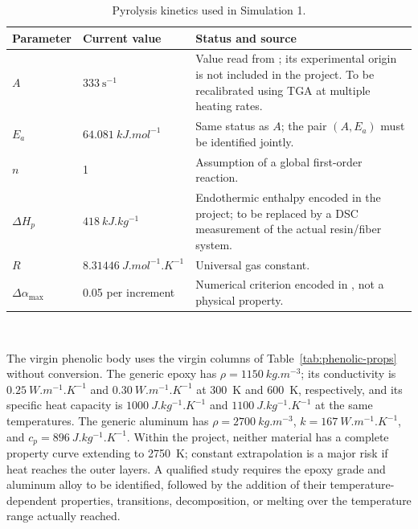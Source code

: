 \documentclass[oneside,openany]{amsdtx}
\begin{document}
\begin{table}[H]
\centering
\small
\renewcommand{\arraystretch}{1.15}
\begin{tabular}{L{0.22\textwidth}M{0.20\textwidth}L{0.47\textwidth}}
\toprule
\textbf{Parameter} & \textbf{Current value} & \textbf{Status and source} \\
\midrule
\(A\) & \(333\ \mathrm{s^{-1}}\) & Value read from
; its experimental origin is not included
in the project. To be recalibrated using TGA at multiple heating rates. \\
\(E_a\) & \(\SI{64.081}{kJ.mol^{-1}}\) & Same status as \(A\); the pair
\((A,E_a)\) must be identified jointly. \\
\(n\) & 1 & Assumption of a global first-order reaction. \\
\(\Delta H_p\) & \(\SI{418}{kJ.kg^{-1}}\) & Endothermic enthalpy encoded in
the project; to be replaced by a DSC measurement of the actual resin/fiber
system. \\
\(R\) & \(\SI{8.31446}{J.mol^{-1}.K^{-1}}\) & Universal gas constant. \\
\(\Delta\alpha_\mathrm{max}\) & 0.05 per increment & Numerical criterion
encoded in , not a physical property. \\
\bottomrule
\end{tabular}~\\[1em]
\caption{Pyrolysis kinetics used in Simulation 1.}
\label{tab:kinetics}
\end{table}

The virgin phenolic body  uses the virgin columns of
Table~\ref{tab:phenolic-props} without conversion. The generic epoxy has
\(\rho=\SI{1150}{kg.m^{-3}}\); its conductivity is
\(\SI{0.25}{W.m^{-1}.K^{-1}}\) and \(\SI{0.30}{W.m^{-1}.K^{-1}}\) at
\SI{300}{K} and \SI{600}{K}, respectively, and its specific heat capacity is
\(\SI{1000}{J.kg^{-1}.K^{-1}}\) and \(\SI{1100}{J.kg^{-1}.K^{-1}}\) at the
same temperatures. The generic aluminum has
\(\rho=\SI{2700}{kg.m^{-3}}\), \(k=\SI{167}{W.m^{-1}.K^{-1}}\), and
\(c_p=\SI{896}{J.kg^{-1}.K^{-1}}\). Within the project, neither material has a
complete property curve extending to \SI{2750}{K}; constant extrapolation is a
major risk if heat reaches the outer layers. A qualified study requires the
epoxy grade and aluminum alloy to be identified, followed by the addition of
their temperature-dependent properties, transitions, decomposition, or melting
over the temperature range actually reached.
\end{document}
